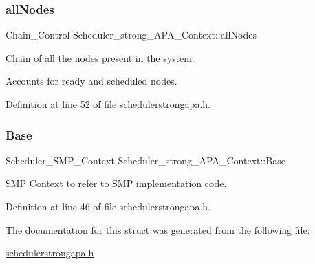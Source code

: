 \subsubsection{\texorpdfstring{all\+Nodes}{allNodes}}
{\footnotesize\ttfamily Chain\+\_\+\+Control Scheduler\+\_\+strong\+\_\+\+A\+P\+A\+\_\+\+Context\+::all\+Nodes}



Chain of all the nodes present in the system. 

Accounts for ready and scheduled nodes. 

Definition at line 52 of file schedulerstrongapa.\+h.

\mbox{\label{structScheduler__strong__APA__Context_a55755b445b7e7beaf1b87b178521e615}} 
\subsubsection{\texorpdfstring{Base}{Base}}
{\footnotesize\ttfamily Scheduler\+\_\+\+S\+M\+P\+\_\+\+Context Scheduler\+\_\+strong\+\_\+\+A\+P\+A\+\_\+\+Context\+::\+Base}



S\+MP Context to refer to S\+MP implementation code. 



Definition at line 46 of file schedulerstrongapa.\+h.



The documentation for this struct was generated from the following file\+:\begin{DoxyCompactItemize}
\item 
\hyperlink{schedulerstrongapa_8h}{schedulerstrongapa.\+h}\end{DoxyCompactItemize}
